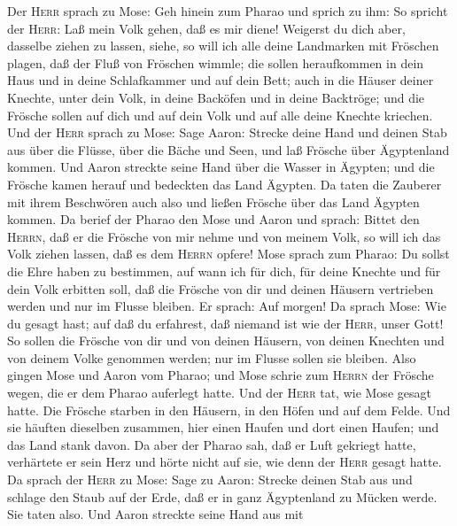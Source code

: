  Der \textsc{Herr} sprach zu Mose: Geh hinein zum Pharao
und sprich zu ihm: So spricht der \textsc{Herr}: Laß mein Volk gehen,
daß es mir diene!  Weigerst du dich aber, dasselbe ziehen
zu lassen, siehe, so will ich alle deine Landmarken mit Fröschen plagen,
 daß der Fluß von Fröschen wimmle; die sollen heraufkommen
in dein Haus und in deine Schlafkammer und auf dein Bett; auch in die
Häuser deiner Knechte, unter dein Volk, in deine Backöfen und in deine
Backtröge;  und die Frösche sollen auf dich und auf dein
Volk und auf alle deine Knechte kriechen.  Und der
\textsc{Herr} sprach zu Mose: Sage Aaron: Strecke deine Hand und deinen
Stab aus über die Flüsse, über die Bäche und Seen, und laß Frösche über
Ägyptenland kommen.  Und Aaron streckte seine Hand über
die Wasser in Ägypten; und die Frösche kamen herauf und bedeckten das
Land Ägypten.  Da taten die Zauberer mit ihrem Beschwören
auch also und ließen Frösche über das Land Ägypten kommen.
 Da berief der Pharao den Mose und Aaron und sprach:
Bittet den \textsc{Herrn}, daß er die Frösche von mir nehme und von
meinem Volk, so will ich das Volk ziehen lassen, daß es dem
\textsc{Herrn} opfere!  Mose sprach zum Pharao: Du sollst
die Ehre haben zu bestimmen, auf wann ich für dich, für deine Knechte
und für dein Volk erbitten soll, daß die Frösche von dir und deinen
Häusern vertrieben werden und nur im Flusse bleiben.  Er
sprach: Auf morgen! Da sprach Mose: Wie du gesagt hast; auf daß du
erfahrest, daß niemand ist wie der \textsc{Herr}, unser Gott!
 So sollen die Frösche von dir und von deinen Häusern,
von deinen Knechten und von deinem Volke genommen werden; nur im Flusse
sollen sie bleiben.  Also gingen Mose und Aaron vom
Pharao; und Mose schrie zum \textsc{Herrn} der Frösche wegen, die er dem
Pharao auferlegt hatte.  Und der \textsc{Herr} tat, wie
Mose gesagt hatte. Die Frösche starben in den Häusern, in den Höfen und
auf dem Felde.  Und sie häuften dieselben zusammen, hier
einen Haufen und dort einen Haufen; und das Land stank davon.
 Da aber der Pharao sah, daß er Luft gekriegt hatte,
verhärtete er sein Herz und hörte nicht auf sie, wie denn der
\textsc{Herr} gesagt hatte.  Da sprach der \textsc{Herr}
zu Mose: Sage zu Aaron: Strecke deinen Stab aus und schlage den Staub
auf der Erde, daß er in ganz Ägyptenland zu Mücken werde.
 Sie taten also. Und Aaron streckte seine Hand aus mit
